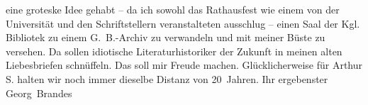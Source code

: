 \begin{ledgroupsized}[t]{13cm}
{{{                        eine groteske Idee gehabt}}}\label{K_L02051_1h} – da ich sowohl das Rathausfest wie einem
                    von der Universität und den Schriftstellern veranstalteten ausschlug – einen
                    Saal der Kgl. Bibliotek zu einem G. B.-Archiv zu verwandeln und mit meiner Büste
                    zu versehen.\pend
           \pstart
           Da sollen idiotische Literaturhistoriker der Zukunft in meinen alten
                    Liebesbriefen schnüffeln. Das soll mir Freude machen.\pend
           \pstart
           Glücklicherweise für Arthur S. halten wir noch immer dieselbe Distanz von
                    20 Jahren.\pend
           \pstart Ihr ergebenster \spacefill\mbox{Georg Brandes}\pend{}\endnumbering{}\end{ledgroupsized}  \newcommand{\dateiname}{L02051}\newcommand{\titel}{Georg Brandes an Arthur und Olga Schnitzler, 3. 2. 1912}\newcommand{\editorInnen}{Martin Anton Müller und Gerd-Hermann Susen}
            \footnotesize
\begin{ledgroupsized}[t]{11.5cm}
\end{ledgroupsized}
         
      